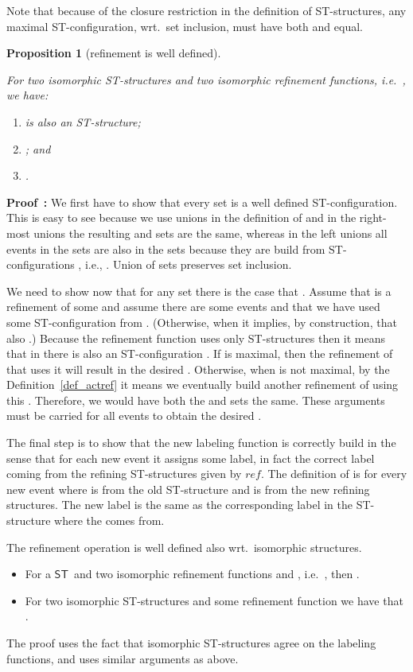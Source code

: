 \documentclass[submission,copyright,creativecommons]{eptcs}
\newtheorem{proposition}[theorem]{Proposition}
\newenvironment{proof}[1][\!\!\,]{\vspace{1ex}\noindent\textbf{Proof #1: }}{\hfill\vspace{2ex}}
\newcounter{case}
\newcommand\ST{\ensuremath{\mathsf{ST}}}
\newcommand\reffun{\ensuremath{\mathit{ref}}}
\begin{document}
Note that because of the closure restriction in the definition of ST-structures, any maximal ST-configuration, wrt.\ set inclusion, must have both  and  equal.

\begin{proposition}[refinement is well defined]\label{prop_ref1}\ 

For two isomorphic ST-structures  and two isomorphic refinement functions, i.e.\ , we have: 

\begin{enumerate}
\item  is also an ST-structure;
\item ; and
\item .
\end{enumerate}
\end{proposition}

\begin{proof}
We first have to show that every set  is a well defined ST-configuration. This is easy to see because we use unions in the definition of  and in the right-most unions the resulting  and  sets are the same, whereas in the left unions all events in the  sets are also in the  sets because they are build from ST-configurations , i.e., . Union of sets preserves set inclusion.

We need to show now that for any set  there is the case that . Assume that  is a refinement of some  and assume there are some events  and that we have used some ST-configuration  from .
(Otherwise, when  it implies, by construction, that also .)
Because the refinement function uses only ST-structures then it means that in  there is also an ST-configuration . 
If  is maximal, then the refinement of  that uses it will result in the desired .
Otherwise, when  is not maximal, by the Definition~\ref{def_actref} it means we eventually build another refinement of  using this . Therefore, we would have both the  and  sets the same. These arguments must be carried for all events  to obtain the desired .

The final step is to show that the new labeling function  is correctly build in the sense that for each new event it assigns some label, in fact the correct label coming from the refining ST-structures given by \reffun. The definition of  is for every new event  where  is from the old ST-structure and  is from the new refining structures. The new label is the same as the corresponding label in the ST-structure where the  comes from.

The refinement operation is well defined also wrt.\ isomorphic structures.
\begin{itemize}
\item For a \ST\ and two isomorphic refinement functions  and , i.e.\ , then .
\item For two isomorphic ST-structures  and some refinement function  we have that \linebreak .
\end{itemize}

The proof uses the fact that isomorphic ST-structures agree on the labeling functions, and uses similar arguments as above.
\end{proof}
\end{document}
